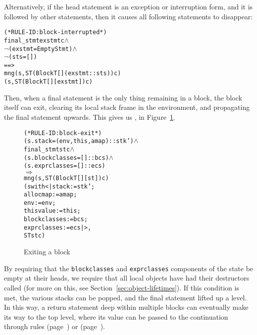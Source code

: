 \documentclass[11pt]{article}
\begin{document}
Alternatively, if the head statement is an exception or interruption
form, and it is followed by other statements, then it causes all
following statements to disappear:
\begin{center}
\begin{minipage}{\textwidth}
\begin{alltt}
(* RULE-ID: block-interrupted *)
     final_stmt exstmt c \(\land\)
     \(\neg\)(exstmt = EmptyStmt) \(\land\)
     \(\neg\)(sts = [])
   ==>
     mng (s, ST (Block T [] (exstmt::sts)) c)
         (s, ST (Block T [] [exstmt]) c)
\end{alltt}
\end{minipage}
\end{center}

Then, when a final statement is the only thing remaining in a block,
the block itself can exit, clearing its local stack frame in the
environment, and propagating the final statement upwards.  This gives
us , in Figure~\ref{fig:block-exit}.
\begin{figure}
\begin{center}
\begin{minipage}{\textwidth}
\begin{alltt}
(* RULE-ID: block-exit *)
     (s.stack = (env,this,amap) :: stk') \(\land\)
     final_stmt st c \(\land\)
     (s.blockclasses = []::bcs) \(\land\)
     (s.exprclasses = []::ecs)
   \(\Rightarrow\)
     mng (s, ST (Block T [] [st]) c)
         (s with <| stack := stk';
                    allocmap := amap;
                    env := env;
                    thisvalue := this;
                    blockclasses := bcs;
                    exprclasses := ecs |>,
          ST st c)
\end{alltt}
\end{minipage}
\end{center}
\caption{Exiting a block}
\label{fig:block-exit}
\end{figure}
%
By requiring that the \texttt{blockclasses} and \texttt{exprclasses}
components of the state be empty at their heads, we require that all
local objects have had their destructors called (for more on this, see
Section~\ref{sec:object-lifetimes}).  If this condition is met, the
various stacks can be popped, and the final statement lifted up a
level.  In this way, a return statement deep within multiple blocks
can eventually make its way to the top level, where its value can be
passed to the continuation through rules 
(page~\pageref{rule:return-rvalue}) or 
(page~\pageref{rule:return-lvalue}). 
\end{document}
